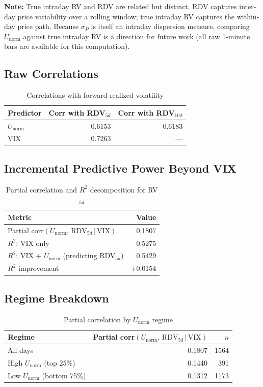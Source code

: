 \documentclass[11pt]{article}
\begin{document}
\textbf{Note:} True intraday RV and RDV are related but distinct. RDV captures inter-day price variability over a rolling window; true intraday RV captures the within-day price path. Because $\sigma_P$ is itself an intraday dispersion measure, comparing $U_\mathrm{norm}$ against true intraday RV is a direction for future work (all raw 1-minute bars are available for this computation).

\subsection{Raw Correlations}

\begin{table}[htbp]
\centering
\caption{Correlations with forward realized volatility}
\begin{tabular}{lrr}
\toprule
Predictor & Corr with RDV$_{5d}$ & Corr with RDV$_{10d}$ \\
\midrule
$U_\mathrm{norm}$ & 0.6153 & 0.6183 \\
VIX               & 0.7263 & --- \\
\bottomrule
\end{tabular}
\end{table}

\subsection{Incremental Predictive Power Beyond VIX}

\begin{table}[htbp]
\centering
\caption{Partial correlation and $R^2$ decomposition for RV$_{5d}$}
\begin{tabular}{lr}
\toprule
Metric & Value \\
\midrule
Partial corr$(U_\mathrm{norm},\, \mathrm{RDV}_{5d}\,|\,\mathrm{VIX})$ & 0.1807 \\
$R^2$: VIX only                & 0.5275 \\
$R^2$: VIX $+$ $U_\mathrm{norm}$ (predicting RDV$_{5d}$) & 0.5429 \\
$R^2$ improvement              & $+0.0154$ \\
\bottomrule
\end{tabular}
\end{table}

\subsection{Regime Breakdown}

\begin{table}[htbp]
\centering
\caption{Partial correlation by $U_\mathrm{norm}$ regime}
\begin{tabular}{lrr}
\toprule
Regime & Partial corr$(U_\mathrm{norm},\, \mathrm{RDV}_{5d}\,|\,\mathrm{VIX})$ & $n$ \\
\midrule
All days                   & 0.1807 & 1564 \\
High $U_\mathrm{norm}$ (top 25\%)    & 0.1440 & 391 \\
Low $U_\mathrm{norm}$ (bottom 75\%)  & 0.1312 & 1173 \\
\bottomrule
\end{tabular}
\end{table}
\end{document}
